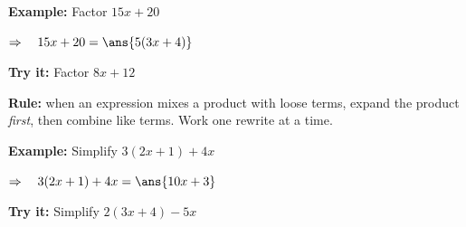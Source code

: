 \documentclass[12pt]{article}
\begin{document}
\begin{examplebox}
\textbf{Example:} \quad Factor $15x + 20$

$\Rightarrow\quad 15x + 20 = \ans{5(3x + 4)}$
\end{examplebox}

\begin{tryitbox}
\textbf{Try it:} \quad Factor $8x + 12$\\[2pt]
\end{tryitbox}


\begin{formulabox}
\textbf{Rule:} when an expression mixes a product with loose terms, expand the
product \emph{first}, then combine like terms. Work one rewrite at a time.
\end{formulabox}

\begin{examplebox}
\textbf{Example:} \quad Simplify $3(2x + 1) + 4x$

$\Rightarrow\quad 3(2x + 1) + 4x = \ans{10x + 3}$
\end{examplebox}

\begin{tryitbox}
\textbf{Try it:} \quad Simplify $2(3x + 4) - 5x$\\[2pt]
\end{tryitbox}
\end{document}
